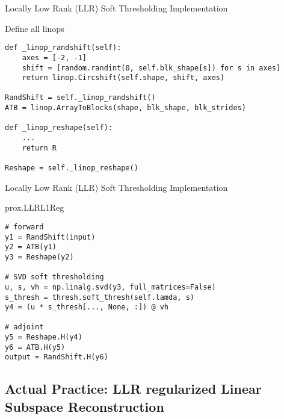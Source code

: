 \begin{frame}[fragile]{Locally Low Rank (LLR) Soft Thresholding Implementation}
\begin{block}{Define all linops}
\begin{lstlisting}
def _linop_randshift(self):
    axes = [-2, -1]
    shift = [random.randint(0, self.blk_shape[s]) for s in axes]
    return linop.Circshift(self.shape, shift, axes)

RandShift = self._linop_randshift()
ATB = linop.ArrayToBlocks(shape, blk_shape, blk_strides)

def _linop_reshape(self):
    ...
    return R

Reshape = self._linop_reshape()
\end{lstlisting}
\end{block}

\end{frame}


\begin{frame}[fragile]{Locally Low Rank (LLR) Soft Thresholding Implementation}
\begin{block}{prox.LLRL1Reg}
\begin{lstlisting}
# forward
y1 = RandShift(input)
y2 = ATB(y1)
y3 = Reshape(y2)

# SVD soft thresholding
u, s, vh = np.linalg.svd(y3, full_matrices=False)
s_thresh = thresh.soft_thresh(self.lamda, s)
y4 = (u * s_thresh[..., None, :]) @ vh

# adjoint
y5 = Reshape.H(y4)
y6 = ATB.H(y5)
output = RandShift.H(y6)
\end{lstlisting}
\end{block}	
\end{frame}


\subsection{Actual Practice: LLR regularized Linear Subspace Reconstruction}


